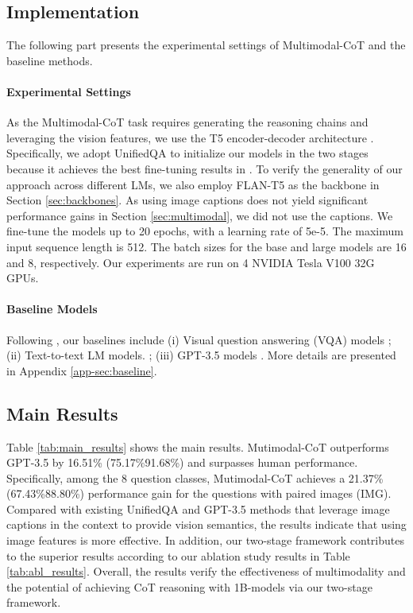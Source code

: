 \documentclass[nohyperref]{article}
\theoremstyle{plain}
\theoremstyle{definition}
\theoremstyle{remark}
\begin{document}
\subsection{Implementation}
The following part presents the experimental settings of Multimodal-CoT and the baseline methods.
\paragraph{Experimental Settings} As the Multimodal-CoT task requires generating the reasoning chains and leveraging the vision features, we use the T5 encoder-decoder architecture \citep{raffel2020exploring}. Specifically, we adopt UnifiedQA \citep{khashabi2020unifiedqa} to initialize our models in the two stages because it achieves the best fine-tuning results in \citet{lu2022learn}. To verify the generality of our approach across different LMs, we also employ FLAN-T5 \citep{chung2022scaling} as the backbone in Section \ref{sec:backbones}. As using image captions does not yield significant performance gains in Section \ref{sec:multimodal}, we did not use the captions. We fine-tune the models up to 20 epochs, with a learning rate of 5e-5. The maximum input sequence length is 512. The batch sizes for the base and large models are 16 and 8, respectively. Our experiments are run on 4 NVIDIA Tesla V100 32G GPUs. 

\paragraph{Baseline Models}
Following \citet{lu2022learn}, our baselines include (i) Visual question answering (VQA) models \citep{Anderson2017up,Kim2018,yu2019mcan,gao2019dynamic,pmlr-v139-kim21k,lu2021iconqa,li2019visualbert}; (ii) Text-to-text LM models. \citep{khashabi2020unifiedqa}; (iii) GPT-3.5 models \citep{chen2020big}. More details are presented in Appendix \ref{app-sec:baseline}.

\subsection{Main Results}
Table \ref{tab:main_results} shows the main results. Mutimodal-CoT outperforms GPT-3.5 by 16.51\% (75.17\%91.68\%) and surpasses human performance. Specifically, among the 8 question classes, Mutimodal-CoT achieves a 21.37\% (67.43\%88.80\%) performance gain for the questions with paired images (IMG). Compared with existing UnifiedQA and GPT-3.5 methods that leverage image captions in the context to provide vision semantics, the results indicate that using image features is more effective. In addition, our two-stage framework contributes to the superior results according to our ablation study results in Table \ref{tab:abl_results}. Overall, the results verify the effectiveness of multimodality and the potential of achieving CoT reasoning with 1B-models via our two-stage framework. 
\end{document}
